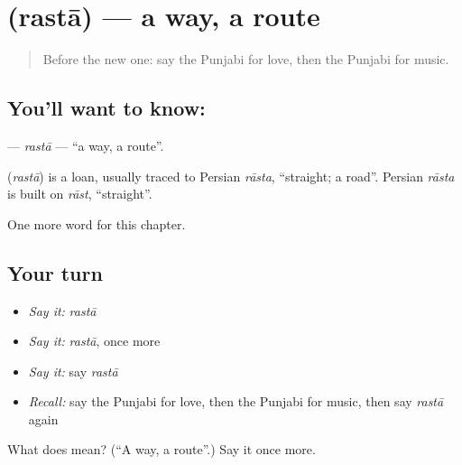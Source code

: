 \section[\texorpdfstring{\pa{ਰਸਤਾ} (rastā)}{ਰਸਤਾ (rastā)}]{ (rastā) — a way, a route}

\label{lesson:PA-C98-rasta}



\begin{quote}
Before the new one: say the Punjabi for love, then the Punjabi for music.
\end{quote}

\subsection*{You'll want to know: }
\textbf{} — \emph{rastā} — \textquotedblleft{}a way, a route\textquotedblright{}.

\begin{cousinweb}
\textbf{} (\emph{rastā}) is a loan, usually traced to Persian \emph{rāsta}, \textquotedblleft{}straight; a road\textquotedblright{}. Persian \emph{rāsta} is built on \emph{rāst}, \textquotedblleft{}straight\textquotedblright{}.
\end{cousinweb}

\begin{grammarlens}[title={What you've built}]
One more word for this chapter.
\end{grammarlens}

\subsection*{Your turn}
\begin{itemize}
\raggedright
  \item \emph{Say it:} \emph{rastā}
  \item \emph{Say it:} \emph{rastā}, once more
  \item \emph{Say it:} say \emph{rastā}
  \item \emph{Recall:} say the Punjabi for love, then the Punjabi for music, then say \emph{rastā} again
\end{itemize}

\begin{tcolorbox}[breakable,colback=teal!4,colframe=teal!35!black,title={Before you move on}]
What does  mean? (\textquotedblleft{}A way, a route\textquotedblright{}.) Say it once more.
\end{tcolorbox}
